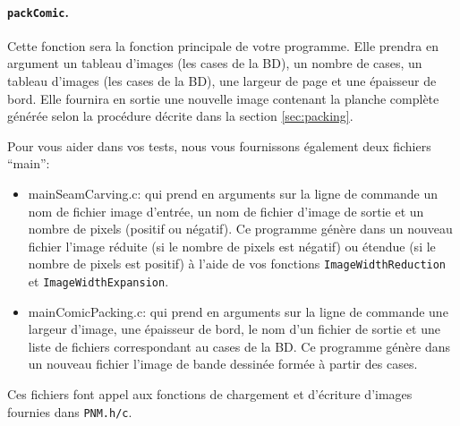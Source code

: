 \documentclass[a4paper,10pt]{article}
\begin{document}
\paragraph{\texttt{packComic}.} Cette fonction sera la fonction  principale de
votre programme. Elle prendra en argument un tableau d'images (les cases de la
BD), un nombre de cases, un tableau d'images (les cases de la BD), une largeur
de page et une épaisseur de bord. Elle fournira en sortie une nouvelle image
contenant la planche complète générée selon la procédure décrite dans la
section \ref{sec:packing}.

Pour vous aider dans vos tests, nous vous fournissons également deux
fichiers ``main'':
\begin{itemize}
\item mainSeamCarving.c: qui prend en arguments sur la ligne de
  commande un nom de fichier image d'entrée, un nom de fichier d'image de sortie et un nombre de pixels (positif ou
  négatif). Ce programme génère dans un nouveau fichier l'image réduite (si le nombre
  de pixels est négatif) ou étendue (si le nombre de pixels est
  positif) à l'aide de vos fonctions \texttt{ImageWidthReduction} et
  \texttt{ImageWidthExpansion}.
\item mainComicPacking.c: qui prend en arguments sur la ligne de
  commande une largeur d'image, une épaisseur de bord, le nom d'un fichier de
  sortie et une liste de fichiers correspondant au cases de la BD. Ce
  programme génère dans un nouveau fichier l'image de bande dessinée
  formée à partir des cases.
\end{itemize}
Ces fichiers font appel aux fonctions de chargement et d'écriture d'images fournies dans \texttt{PNM.h/c}.


\end{document}
